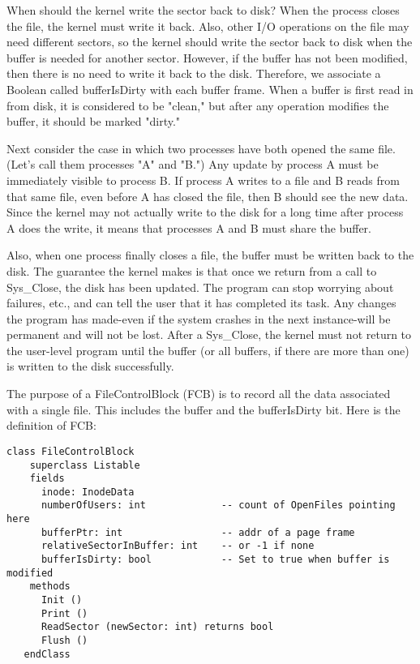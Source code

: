 \documentclass[12pt]{article}
\begin{document}
When should the kernel write the sector back to disk?  When the
process closes the file, the kernel must write it back.  Also, other
I/O operations on the file may need different sectors, so the kernel
should write the sector back to disk when the buffer is needed for
another sector.  However, if the buffer has not been modified, then
there is no need to write it back to the disk.  Therefore, we
associate a Boolean called bufferIsDirty with each buffer frame.  When
a buffer is first read in from disk, it is considered to be "clean,"
but after any operation modifies the buffer, it should be marked
"dirty."

Next consider the case in which two processes have both opened the
same file.  (Let's call them processes "A" and "B.")  Any update by
process A must be immediately visible to process B.  If process A
writes to a file and B reads from that same file, even before A has
closed the file, then B should see the new data.  Since the kernel may
not actually write to the disk for a long time after process A does
the write, it means that processes A and B must share the buffer.

Also, when one process finally closes a file, the buffer must be
written back to the disk.  The guarantee the kernel makes is that once
we return from a call to Sys\_Close, the disk has been updated.  The
program can stop worrying about failures, etc., and can tell the user
that it has completed its task.  Any changes the program has made-even
if the system crashes in the next instance-will be permanent and will
not be lost.  After a Sys\_Close, the kernel must not return to the
user-level program until the buffer (or all buffers, if there are more
than one) is written to the disk successfully.

The purpose of a FileControlBlock (FCB) is to record all the data
associated with a single file.  This includes the buffer and the
bufferIsDirty bit.  Here is the definition of FCB:

\begin{verbatim}
class FileControlBlock
    superclass Listable
    fields
      inode: InodeData
      numberOfUsers: int             -- count of OpenFiles pointing here
      bufferPtr: int                 -- addr of a page frame
      relativeSectorInBuffer: int    -- or -1 if none
      bufferIsDirty: bool            -- Set to true when buffer is modified
    methods
      Init ()
      Print ()
      ReadSector (newSector: int) returns bool
      Flush ()
   endClass
\end{verbatim}
\end{document}
